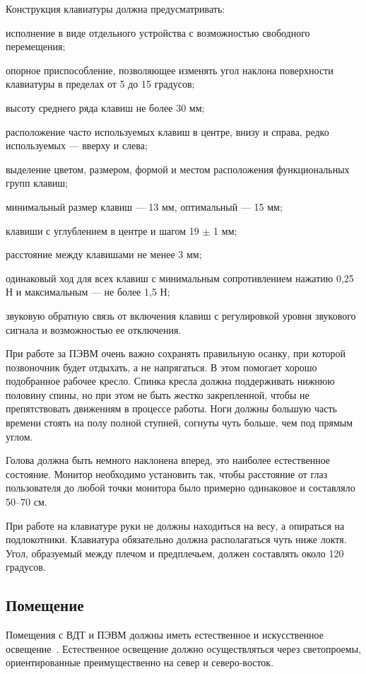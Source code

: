 Конструкция клавиатуры должна предусматривать:
\begin{compactitem}
\item исполнение в виде отдельного устройства с возможностью свободного перемещения;
\item опорное приспособление, позволяющее изменять угол наклона поверхности клавиатуры в пределах от 5 до 15 градусов;
\item высоту среднего ряда клавиш не более 30 мм;
\item расположение часто используемых клавиш в центре, внизу и справа, редко используемых --- вверху и слева;
\item выделение цветом, размером, формой и местом расположения функциональных групп клавиш;
\item минимальный размер клавиш --- 13 мм, оптимальный --- 15 мм;
\item клавиши с углублением в центре и шагом 19 $\pm$ 1 мм;
\item расстояние между клавишами не менее 3 мм;
\item одинаковый ход для всех клавиш с минимальным сопротивлением нажатию 0,25 Н и максимальным --- не более 1,5 Н;
\item звуковую обратную связь от включения клавиш с регулировкой уровня звукового сигнала и возможностью ее отключения.
\end{compactitem}

При работе за ПЭВМ очень важно сохранять правильную осанку, при которой позвоночник будет отдыхать, а не напрягаться. В этом помогает хорошо подобранное рабочее кресло. Спинка кресла должна поддерживать нижнюю половину спины, но при этом не быть жестко закрепленной, чтобы не препятствовать движениям в процессе работы. Ноги должны большую часть времени стоять на полу полной ступней, согнуты чуть больше, чем под прямым углом.

Голова должна быть немного наклонена вперед, это наиболее естественное состояние. Монитор необходимо установить так, чтобы расстояние от глаз пользователя до любой точки монитора было примерно одинаковое и составляло 50--70 см. 

При работе на клавиатуре руки не должны находиться на весу, а опираться на подлокотники. Клавиатура обязательно должна располагаться чуть ниже локтя. Угол, образуемый между плечом и предплечьем, должен составлять около 120 градусов.

\subsection{Помещение}
\label{sec:bgd:pomeschenie}
 Помещения с ВДТ и ПЭВМ должны иметь естественное и искусственное освещение~\cite{BGDGigi2004}. Естественное освещение должно осуществляться через светопроемы, ориентированные преимущественно на север и северо-восток.\par{}


